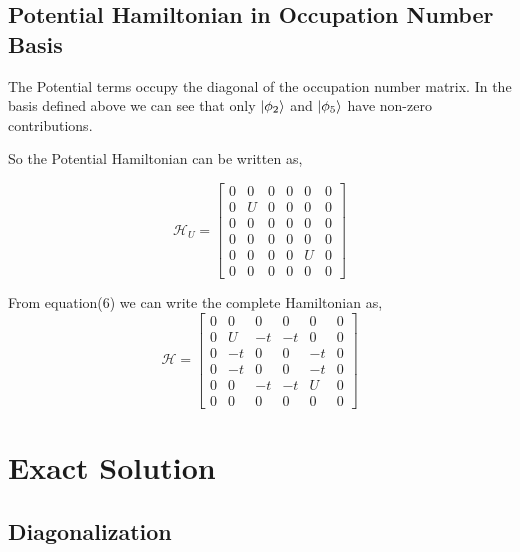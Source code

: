 \documentclass{article}
\begin{document}
\subsection{Potential Hamiltonian in Occupation Number Basis}
The Potential terms occupy the diagonal of the occupation number matrix. In the basis defined above we can see that
only \(\ket{\phi_2} \) and \(\ket{\phi_5}\) have non-zero contributions.

So the Potential Hamiltonian can be written as,

\begin{equation}
  \mathcal{H}_U =
  \begin{bmatrix}
    0 & 0 & 0 & 0 & 0 & 0 \\
    0 & U & 0 & 0 & 0 & 0 \\
    0 & 0 & 0 & 0 & 0 & 0 \\
    0 & 0 & 0 & 0 & 0 & 0 \\
    0 & 0 & 0 & 0 & U & 0 \\
    0 & 0 & 0 & 0 & 0 & 0
  \end{bmatrix}
\end{equation}

From equation(6) we can write the complete Hamiltonian as,
\begin{equation}
  \mathcal{H} =
  \begin{bmatrix}
    0 & 0 & 0 & 0 & 0 & 0   \\
    0 & U & -t & -t & 0 & 0 \\
    0 & -t & 0 & 0 & -t & 0 \\
    0 & -t & 0 & 0 & -t & 0 \\
    0 & 0 & -t & -t & U & 0 \\
    0 & 0 & 0 & 0 & 0 & 0
  \end{bmatrix}
\end{equation}
\section{Exact Solution}
\subsection{Diagonalization}
\end{document}
